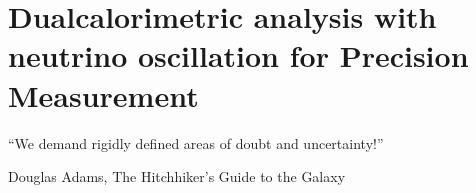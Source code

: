 \documentclass[../main.tex]{subfiles}
\begin{document}
\chapter{Dualcalorimetric analysis with neutrino oscillation for Precision Measurement}
\label{sec:joint_fit}

\epigraph{``We demand rigidly defined areas of doubt and uncertainty!''}{Douglas Adams, The Hitchhiker's Guide to the Galaxy}

\minitoc

%
%
%
%
%
%
%
\end{document}
